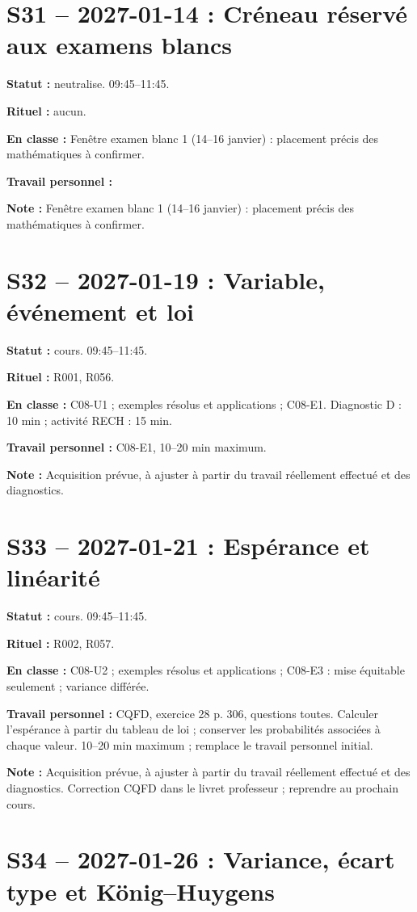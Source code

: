 \section*{S31 -- 2027-01-14 : Créneau réservé aux examens blancs}
\textbf{Statut :} neutralise. 09:45–11:45.\par\textbf{Rituel :} aucun.\par\textbf{En classe :} Fenêtre examen blanc 1 (14–16 janvier) : placement précis des mathématiques à confirmer.\par\textbf{Travail personnel :} \par\textbf{Note :} Fenêtre examen blanc 1 (14–16 janvier) : placement précis des mathématiques à confirmer.
\section*{S32 -- 2027-01-19 : Variable, événement et loi}
\textbf{Statut :} cours. 09:45–11:45.\par\textbf{Rituel :} R001, R056.\par\textbf{En classe :} C08-U1 ; exemples résolus et applications ; C08-E1. Diagnostic D : 10 min ; activité RECH : 15 min.\par\textbf{Travail personnel :} C08-E1, 10–20 min maximum.\par\textbf{Note :} Acquisition prévue, à ajuster à partir du travail réellement effectué et des diagnostics.
\section*{S33 -- 2027-01-21 : Espérance et linéarité}
\textbf{Statut :} cours. 09:45–11:45.\par\textbf{Rituel :} R002, R057.\par\textbf{En classe :} C08-U2 ; exemples résolus et applications ; C08-E3 : mise équitable seulement ; variance différée. \par\textbf{Travail personnel :} CQFD, exercice 28 p. 306, questions toutes. Calculer l’espérance à partir du tableau de loi ; conserver les probabilités associées à chaque valeur. 10–20 min maximum ; remplace le travail personnel initial.\par\textbf{Note :} Acquisition prévue, à ajuster à partir du travail réellement effectué et des diagnostics. Correction CQFD dans le livret professeur ; reprendre au prochain cours.
\section*{S34 -- 2027-01-26 : Variance, écart type et König–Huygens}
